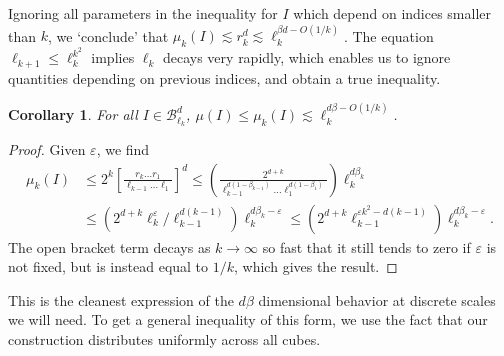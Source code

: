 \documentclass[usenames,dvipsnames,letterpaper, reqno,11pt]{article}
\theoremstyle{plain}
\newtheorem{corollary}{Corollary}
\theoremstyle{plain}
\begin{document}
Ignoring all parameters in the inequality for $I$ which depend on indices smaller than $k$, we `conclude' that $\mu_k(I) \lesssim r_k^d \lesssim \ell_k^{\beta d - O(1/k)}$. The equation $\ell_{k+1} \leq \ell_k^{k^2}$ implies $\ell_k$ decays very rapidly, which enables us to ignore quantities depending on previous indices, and obtain a true inequality.

\begin{corollary}
	For all $I \in \mathcal{B}^d_{\ell_k}$, $\mu(I) \leq \mu_k(I) \lesssim \ell_k^{d \beta - O(1/k)}$.
\end{corollary}
\begin{proof}
	Given $\varepsilon$, we find
	\begin{align*}
		\mu_k(I) &\leq 2^k \left[ \frac{r_k \dots r_1}{\ell_{k-1} \dots \ell_1} \right]^d \leq \left( \frac{2^{d + k}}{\ell_{k-1}^{d(1 - \beta_{k-1})} \dots \ell_1^{d(1 - \beta_1)}} \right) \ell_k^{d \beta_k}\\
		&\leq \left( 2^{d + k} \ell_k^\varepsilon / \ell_{k-1}^{d(k-1)} \right) \ell_k^{d \beta_k - \varepsilon} \leq \left( 2^{d + k} \ell_{k-1}^{\varepsilon k^2 - d(k - 1)} \right) \ell_k^{d \beta_k - \varepsilon}.
	\end{align*}
	The open bracket term decays as $k \to \infty$ so fast that it still tends to zero if $\varepsilon$ is not fixed, but is instead equal to $1/k$, which gives the result.
\end{proof}



This is the cleanest expression of the $d \beta$ dimensional behavior at discrete scales we will need. To get a general inequality of this form, we use the fact that our construction distributes uniformly across all cubes.
\end{document}
